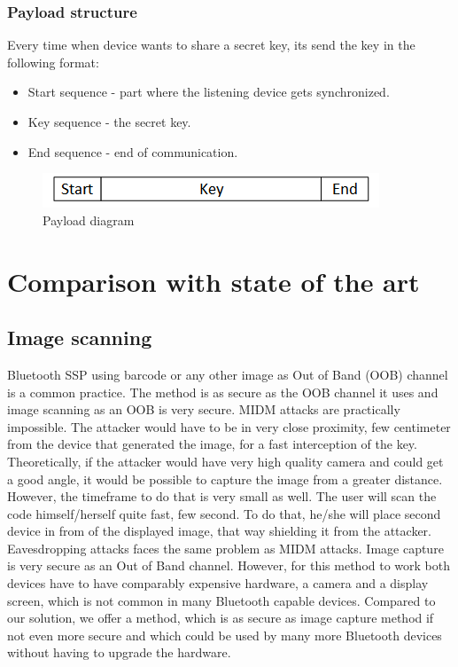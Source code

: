 \documentclass[12pt]{article}
\begin{document}
\subsubsection{Payload structure}
Every time when device wants to share a secret key, its send the key in the following format:

\begin{itemize}
    \item Start sequence - part where the listening device gets synchronized.
    \item Key sequence - the secret key.
    \item End sequence - end of communication.
\end{itemize}

\begin{figure}[h!]
    \includegraphics[scale=1]{fig/payload.png}
    \caption{Payload diagram}
\end{figure}


\newpage

\section{Comparison with state of the art}
\label{sec:Comparison with state of the art}

\subsection{Image scanning}
\label{sub:Image scanning}

Bluetooth SSP using barcode or any other image as Out of Band (OOB) channel is a common practice. The method is as secure as the OOB channel it uses and image scanning as an OOB is very secure. MIDM attacks are practically impossible. The attacker would have to be in very close proximity, few centimeter from the device that generated the image, for a fast interception of the key. Theoretically, if the attacker would have very high quality camera and could get a good angle, it would be possible to capture the image from a greater distance. However, the timeframe to do that is very small as well. The user will scan the code himself/herself quite fast, few second. To do that, he/she will place second device in from of the displayed image, that way shielding it from the attacker. Eavesdropping attacks faces the same problem as MIDM attacks.
Image capture is very secure as an Out of Band channel. However, for this method to work both devices have to have comparably expensive hardware, a camera and a display screen, which is not common in many Bluetooth capable devices. Compared to our solution, we offer a method, which is as secure as image capture method if not even more secure and which could be used by many more Bluetooth devices without having to upgrade the hardware.
\end{document}
